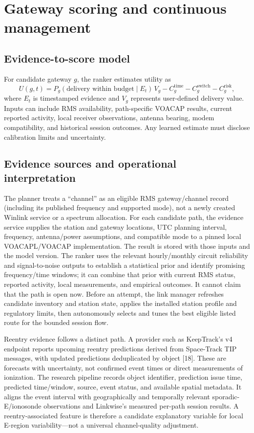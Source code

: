 \documentclass[11pt,a4paper]{article}
\begin{document}
\section{Gateway scoring and continuous management}
\subsection{Evidence-to-score model}
For candidate gateway \(g\), the ranker estimates utility as
\[
U(g,t)=P_g(\text{delivery within budget}\mid E_t)\,V_g
       -C_g^{\mathrm{time}}-C_g^{\mathrm{switch}}-C_g^{\mathrm{risk}},
\]
where \(E_t\) is timestamped evidence and \(V_g\) represents user-defined delivery value. Inputs can include RMS availability, path-specific VOACAP results, current reported activity, local receiver observations, antenna bearing, modem compatibility, and historical session outcomes. Any learned estimate must disclose calibration limits and uncertainty.

\subsection{Evidence sources and operational interpretation}
The planner treats a ``channel'' as an eligible RMS gateway/channel record (including its published frequency and supported mode), not a newly created Winlink service or a spectrum allocation. For each candidate path, the evidence service supplies the station and gateway locations, UTC planning interval, frequency, antenna/power assumptions, and compatible mode to a pinned local VOACAPL/VOACAP implementation. The result is stored with those inputs and the model version. The ranker uses the relevant hourly/monthly circuit reliability and signal-to-noise outputs to establish a statistical prior and identify promising frequency/time windows; it can combine that prior with current RMS status, reported activity, local measurements, and empirical outcomes. It cannot claim that the path is open now. Before an attempt, the link manager refreshes candidate inventory and station state, applies the installed station profile and regulatory limits, then autonomously selects and tunes the best eligible listed route for the bounded session flow.

Reentry evidence follows a distinct path. A provider such as KeepTrack's v4 endpoint reports upcoming reentry predictions derived from Space-Track TIP messages, with updated predictions deduplicated by object [18]. These are forecasts with uncertainty, not confirmed event times or direct measurements of ionization. The research pipeline records object identifier, prediction issue time, predicted time/window, source, event status, and available spatial metadata. It aligns the event interval with geographically and temporally relevant sporadic-E/ionosonde observations and Linkwise's measured per-path session results. A reentry-associated feature is therefore a candidate explanatory variable for local E-region variability—not a universal channel-quality adjustment.
\end{document}
